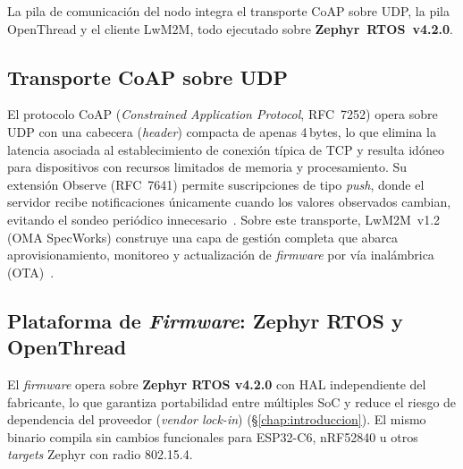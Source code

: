 La pila de comunicación del nodo integra el transporte CoAP sobre UDP, la pila OpenThread y el cliente LwM2M, todo ejecutado sobre \textbf{Zephyr~RTOS~v4.2.0}.

\subsection{Transporte CoAP sobre UDP}
\label{sec:nodo-coap}

El protocolo CoAP (\emph{Constrained Application Protocol}, RFC~7252) opera sobre UDP con una cabecera (\emph{header}) compacta de apenas 4\,bytes, lo que elimina la latencia asociada al establecimiento de conexión típica de TCP y resulta idóneo para dispositivos con recursos limitados de memoria y procesamiento. Su extensión Observe (RFC~7641) permite suscripciones de tipo \emph{push}, donde el servidor recibe notificaciones únicamente cuando los valores observados cambian, evitando el sondeo periódico innecesario~\cite{shahinzadehSmartHomeConnectivity2024, RFC7252, karimiIIoTCommunicationProtocols2025}. Sobre este transporte, LwM2M~v1.2 (OMA SpecWorks) construye una capa de gestión completa que abarca aprovisionamiento, monitoreo y actualización de \emph{firmware} por vía inalámbrica (OTA)~\cite{haEnablingDynamicLightweight2018, karaagacLightweightM2MSurvey2018}.

\subsection{Plataforma de \emph{Firmware}: Zephyr RTOS y OpenThread}
\label{sec:nodo-firmware-zephyr}

El \emph{firmware} opera sobre \textbf{Zephyr RTOS v4.2.0} con HAL independiente del fabricante, lo que garantiza portabilidad entre múltiples SoC y reduce el riesgo de dependencia del proveedor (\emph{vendor lock-in}) (§\ref{chap:introduccion}). El mismo binario compila sin cambios funcionales para ESP32-C6, nRF52840 u otros \emph{targets} Zephyr con radio 802.15.4.


